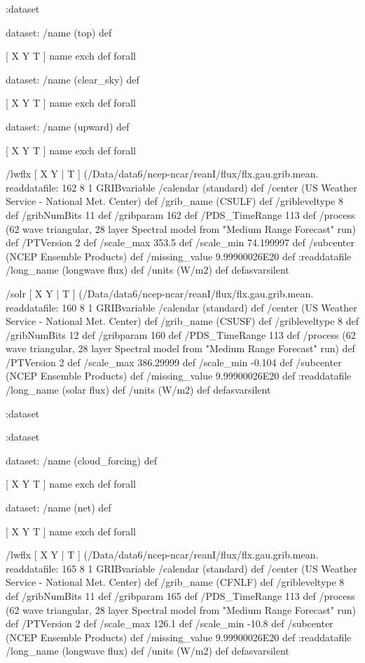 \begin{ingrid}
 :dataset

 dataset: /name (top) def

  [ X Y T ] { name exch def } forall

  dataset: /name (clear_sky) def

   [ X Y T ] { name exch def } forall

   dataset: /name (upward) def

    [ X Y T ] { name exch def } forall

    /lwflx { [ X Y | T ] (/Data/data6/ncep-ncar/reanI/flux/flx.gau.grib.mean.%
    readdatafile:
    162 8 1 GRIBvariable
    /calendar (standard) def
    /center (US Weather Service - National Met. Center) def
    /grib_name (CSULF) def
    /gribleveltype 8 def
    /gribNumBits 11 def
    /gribparam 162 def
    /PDS_TimeRange 113 def
    /process (62 wave triangular, 28 layer Spectral model from "Medium Range Forecast" run) def
    /PTVersion 2 def
    /scale_max 353.5 def
    /scale_min 74.199997 def
    /subcenter (NCEP Ensemble Products) def
    /missing_value 9.99900026E20 def
    :readdatafile
    /long_name (longwave flux) def
    /units (W/m2) def
    } defasvarsilent

    /solr { [ X Y | T ] (/Data/data6/ncep-ncar/reanI/flux/flx.gau.grib.mean.%
    readdatafile:
    160 8 1 GRIBvariable
    /calendar (standard) def
    /center (US Weather Service - National Met. Center) def
    /grib_name (CSUSF) def
    /gribleveltype 8 def
    /gribNumBits 12 def
    /gribparam 160 def
    /PDS_TimeRange 113 def
    /process (62 wave triangular, 28 layer Spectral model from "Medium Range Forecast" run) def
    /PTVersion 2 def
    /scale_max 386.29999 def
    /scale_min -0.104 def
    /subcenter (NCEP Ensemble Products) def
    /missing_value 9.99900026E20 def
    :readdatafile
    /long_name (solar flux) def
    /units (W/m2) def
    } defasvarsilent

   :dataset

  :dataset

  dataset: /name (cloud_forcing) def

   [ X Y T ] { name exch def } forall

   dataset: /name (net) def

    [ X Y T ] { name exch def } forall

    /lwflx { [ X Y | T ] (/Data/data6/ncep-ncar/reanI/flux/flx.gau.grib.mean.%
    readdatafile:
    165 8 1 GRIBvariable
    /calendar (standard) def
    /center (US Weather Service - National Met. Center) def
    /grib_name (CFNLF) def
    /gribleveltype 8 def
    /gribNumBits 11 def
    /gribparam 165 def
    /PDS_TimeRange 113 def
    /process (62 wave triangular, 28 layer Spectral model from "Medium Range Forecast" run) def
    /PTVersion 2 def
    /scale_max 126.1 def
    /scale_min -10.8 def
    /subcenter (NCEP Ensemble Products) def
    /missing_value 9.99900026E20 def
    :readdatafile
    /long_name (longwave flux) def
    /units (W/m2) def
    } defasvarsilent


\end{ingrid}
